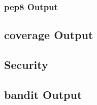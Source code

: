 	\subsubsection{pep8 Output}
	

	\subsection{coverage Output}
	
	
	\subsection{Security}
	\subsection{bandit Output}
	